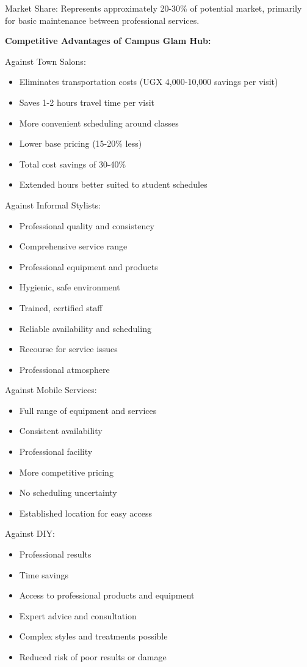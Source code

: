 \documentclass[a4paper,12pt]{article}
\begin{document}
Market Share: Represents approximately 20-30\% of potential market, primarily for basic maintenance between professional services.

\textbf{Competitive Advantages of Campus Glam Hub:}

Against Town Salons:
\begin{itemize}[leftmargin=2em]
    \item Eliminates transportation costs (UGX 4,000-10,000 savings per visit)
    \item Saves 1-2 hours travel time per visit
    \item More convenient scheduling around classes
    \item Lower base pricing (15-20\% less)
    \item Total cost savings of 30-40\%
    \item Extended hours better suited to student schedules
\end{itemize}

Against Informal Stylists:
\begin{itemize}[leftmargin=2em]
    \item Professional quality and consistency
    \item Comprehensive service range
    \item Professional equipment and products
    \item Hygienic, safe environment
    \item Trained, certified staff
    \item Reliable availability and scheduling
    \item Recourse for service issues
    \item Professional atmosphere
\end{itemize}

Against Mobile Services:
\begin{itemize}[leftmargin=2em]
    \item Full range of equipment and services
    \item Consistent availability
    \item Professional facility
    \item More competitive pricing
    \item No scheduling uncertainty
    \item Established location for easy access
\end{itemize}

Against DIY:
\begin{itemize}[leftmargin=2em]
    \item Professional results
    \item Time savings
    \item Access to professional products and equipment
    \item Expert advice and consultation
    \item Complex styles and treatments possible
    \item Reduced risk of poor results or damage
\end{itemize}
\end{document}
